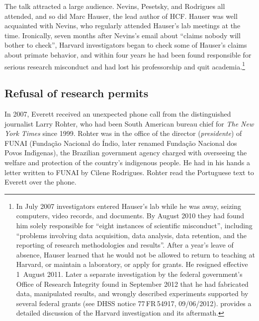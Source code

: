 \documentclass[output=paper,colorlinks,citecolor=brown
]{langscibook}
\begin{document}
The talk attracted a large audience. Nevins, Pesetsky, and Rodrigues
all attended, and so did Marc Hauser, the lead author of HCF. Hauser
was well acquainted with Nevins, who regularly attended Hauser's lab
meetings at the time. Ironically, seven months after Nevins's email
about ``claims nobody will bother to check'', Harvard investigators
began to check some of Hauser's claims about primate behavior, and
within four years he had been found responsible for serious research
misconduct and had lost his professorship and quit
academia.\footnote{\label{misconduct}%
   In July 2007 investigators entered Hauser's lab while he was away,
   seizing computers, video records, and documents. By August 2010
   they had found him solely responsible for ``eight instances of
   scientific misconduct'', including ``problems involving data
   acquisition, data analysis, data retention, and the reporting of
   research methodologies and results''. After a year's leave of
   absence, Hauser learned that he would not be allowed to return
   to teaching at Harvard, or maintain a laboratory, or apply for grants.
   He resigned effective 1~August 2011. Later a separate investigation by
   the federal government's Office of Research Integrity found in September
   2012 that he had fabricated data, manipulated results, and wrongly
   described experiments supported by several federal grants (see DHSS
   notice 77\,FR\,54917, 09/06/2012). \citet{Gross11} provides a detailed
   discussion of the Harvard investigation and its aftermath.}

\subsection{Refusal of research permits}

In 2007, Everett received an unexpected phone call from the distinguished
journalist Larry Rohter, who had been South American bureau chief for
\textit{The New York Times} since 1999. Rohter was in the office of
the director (\textit{presidente}) of FUNAI
(Funda{\c{c}}{\~a}o Nacional do {\'I}ndio, later renamed
Funda{\c{c}}{\~a}o Nacional dos Povos Ind{\'\i}genas), the Brazilian
government agency charged with overseeing the welfare and protection of
the country's indigenous people.
He had in his hands a letter written to FUNAI by Cilene Rodrigues.
Rohter read the Portuguese text to Everett over the phone.
\end{document}

